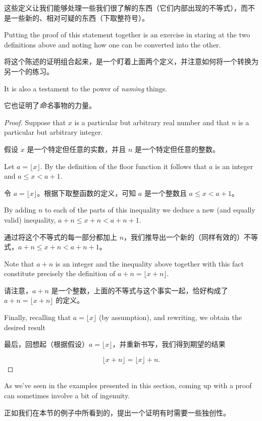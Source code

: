这些定义让我们能够处理一些我们很了解的东西（它们内部出现的不等式），而不是一些新的、相对可疑的东西（下取整符号）。

Putting the proof 
of this statement together is an exercise in staring at the two definitions 
above and noting how one can be converted into the other.

将这个陈述的证明组合起来，是一个盯着上面两个定义，并注意如何将一个转换为另一个的练习。

It is also a 
testament to the power of \emph{naming} things.

它也证明了\emph{命名}事物的力量。

\begin{proof}
Suppose that $x$ is a particular but arbitrary real number 
and that $n$ is a particular but arbitrary integer.

假设 $x$ 是一个特定但任意的实数，并且 $n$ 是一个特定但任意的整数。

Let 
$a = \lfloor x \rfloor$.  By the definition of the floor function 
it follows that $a$ is an integer and $a \leq x < a+1$.

令 $a = \lfloor x \rfloor$。根据下取整函数的定义，可知 $a$ 是一个整数且 $a \leq x < a+1$。

By adding 
$n$ to each of the parts of this inequality
we deduce a new (and equally valid) inequality, $a+n \leq x+n < a+n+1$.

通过将这个不等式的每一部分都加上 $n$，我们推导出一个新的（同样有效的）不等式，$a+n \leq x+n < a+n+1$。

Note that $a+n$ is an integer and the inequality above together with
this fact constitute precisely the definition of 
$a + n = \lfloor x + n \rfloor$.

请注意，$a+n$ 是一个整数，上面的不等式与这个事实一起，恰好构成了 $a + n = \lfloor x + n \rfloor$ 的定义。

Finally, recalling that 
$a = \lfloor x \rfloor$ (by assumption), and rewriting, we obtain the
desired result

最后，回想起（根据假设）$a = \lfloor x \rfloor$，并重新书写，我们得到期望的结果

\[ \lfloor x + n \rfloor = \lfloor x \rfloor + n.
\]

\end{proof} 

As we've seen in the examples presented in this section, coming up
with a proof can sometimes involve a bit of ingenuity.

正如我们在本节的例子中所看到的，提出一个证明有时需要一些独创性。

